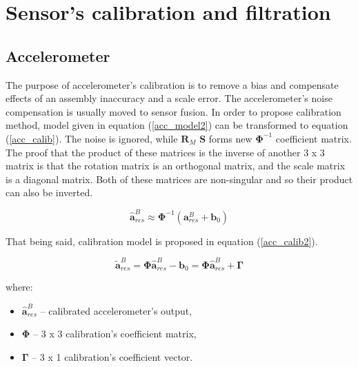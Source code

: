 \section{Sensor's calibration and filtration}



\subsection{Accelerometer}

The purpose of accelerometer's calibration is to remove a bias and compensate effects of an assembly inaccuracy and a scale error. The accelerometer's noise compensation is usually moved to sensor fusion. In order to propose calibration method, model given in equation (\ref{acc_model2}) can be transformed to equation (\ref{acc_calib}). The noise is ignored, while $\bm{R}_M$ $\bm{S}$ forms new $\bm{\Phi}^{-1}$ coefficient matrix. The proof that the product of these matrices is the inverse of another 3 x 3 matrix is that the rotation matrix is an orthogonal matrix, and the scale matrix is a diagonal matrix. Both of these matrices are non-singular and so their product can also be inverted.

\begin{equation}
	\bm{\hat{a}}_{res}^B \approx \bm{\Phi}^{-1} \left( \bm{a}_{res}^B + \bm{b}_0 \right)
	\label{acc_calib}
\end{equation}

That being said, calibration model is proposed in equation (\ref{acc_calib2}).

\begin{equation}
	\bm{\tilde{a}}_{res}^B = \bm{\Phi} \bm{\hat{a}}_{res}^B - \bm{b}_0 = \bm{\Phi} \bm{\hat{a}}_{res}^B + \bm{\Gamma}
	\label{acc_calib2}
\end{equation}

where:
\begin{itemize}
	\item $\bm{\hat{a}}_{res}^B$ -- calibrated accelerometer's output,
	\item $\bm{\Phi}$ -- 3 x 3 calibration's coefficient matrix,
	\item $\bm{\Gamma}$ -- 3 x 1 calibration's coefficient vector.
\end{itemize}

